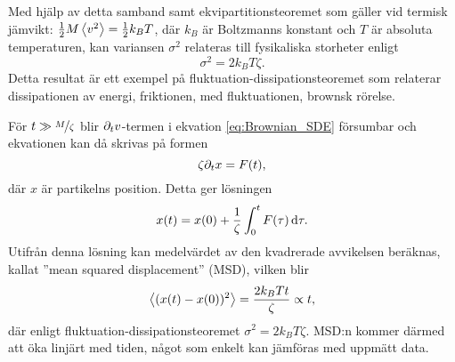 Med hjälp av detta samband samt ekvipartitionsteoremet som gäller vid termisk jämvikt: $\frac{1}{2}M\ev{v^2}=\frac{1}{2}k_BT$, där $k_B$ är Boltzmanns konstant och $T$ är absoluta temperaturen, kan variansen $\sigma^2$ relateras till fysikaliska storheter enligt
\begin{equation}
    \sigma^2 = 2k_BT\zeta.
\end{equation}
Detta resultat är ett exempel på fluktuation-dissipationsteoremet som relaterar dissipationen av energi, friktionen, med fluktuationen, brownsk rörelse. 

För $t \gg \nicefrac{M}{\zeta}$ blir $\partial_t v$-termen i ekvation \eqref{eq:Brownian_SDE}  försumbar och ekvationen kan då skrivas på formen
\begin{equation}
    \zeta \partial_t x=F(t),
\end{equation}
där $x$ är partikelns position. Detta ger lösningen
\begin{equation}
    x(t)=x(0)+\frac{1}{\zeta} \int^t_0 F(\tau)\,\mathrm{d}\tau.
\end{equation}
Utifrån denna lösning kan medelvärdet av den kvadrerade avvikelsen beräknas, kallat ''mean squared displacement'' (MSD), vilken blir 
\begin{equation}\label{eq:MSD_brown}
    \ev{(x(t)-x(0))^2}=\frac{2k_BTt}{\zeta} \propto t,
\end{equation}
där enligt fluktuation-dissipationsteoremet  $\sigma^2=2k_BT\zeta$. MSD:n kommer därmed att öka linjärt med tiden, något som enkelt kan jämföras med uppmätt data.




